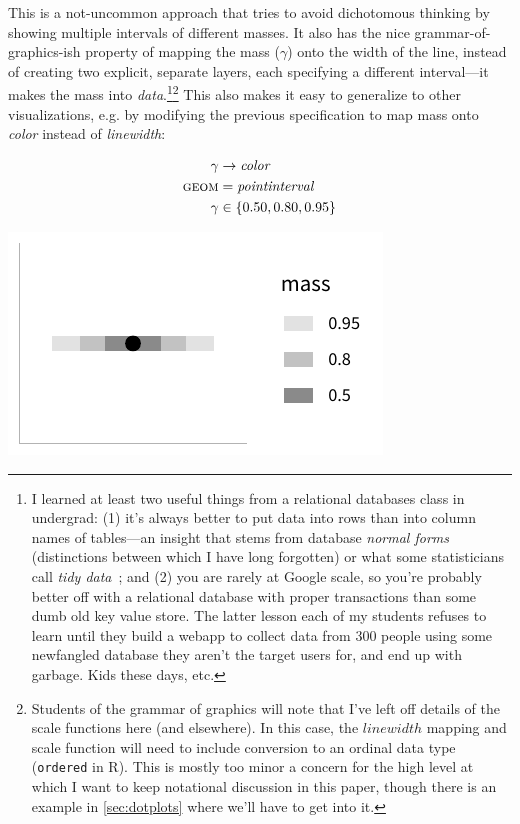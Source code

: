 \documentclass[journal]{vgtc}              %
\begin{document}
This is a not-uncommon approach that tries to avoid dichotomous thinking by showing multiple intervals of different masses. It also has the nice grammar-of-graphics-ish property of mapping the mass ($\gamma$) onto the width of the line, instead of creating two explicit, separate layers, each specifying a different interval---it makes the mass into \textit{data}.\footnote{I learned at least two useful things from a relational databases class in undergrad: (1) it's always better to put data into rows than into column names of tables---an insight that stems from database \textit{normal forms}~\cite{codd1990relational} (distinctions between which I have long forgotten) or what some statisticians call \textit{tidy data}~\cite{hadley2014tidy}; and (2) you are rarely at Google scale, so you're probably better off with a relational database with proper transactions than some dumb old key value store. The latter lesson each of my students refuses to learn until they build a webapp to collect data from 300 people using some newfangled database they aren't the target users for, and end up with garbage. Kids these days, etc.}\footnote{Students of the grammar of graphics will note that I've left off details of the scale functions here (and elsewhere). In this case, the $linewidth$ mapping and scale function will need to include conversion to an ordinal data type (\texttt{ordered} in R). This is mostly too minor a concern for the high level at which I want to keep notational discussion in this paper, though there is an example in \cref{sec:dotplots} where we'll have to get into it.} This also makes it easy to generalize to other visualizations, e.g. by modifying the previous specification to map mass onto \textit{color} instead of \textit{linewidth}:


\noindent
\begin{minipage}{.5\columnwidth}

\begin{align*}
\gamma &\rightarrow \mathit{color}\\
\textsc{geom} &= \mathit{pointinterval}\\
\gamma &\in \{0.50, 0.80, 0.95\}
\end{align*}
\end{minipage}%
  \begin{minipage}{.4\columnwidth}
    \centering
    \includegraphics[width=1.2\columnwidth]{figs/3-stat_pointinterval_color.pdf}
  \end{minipage}
\hfill\break
\end{document}
